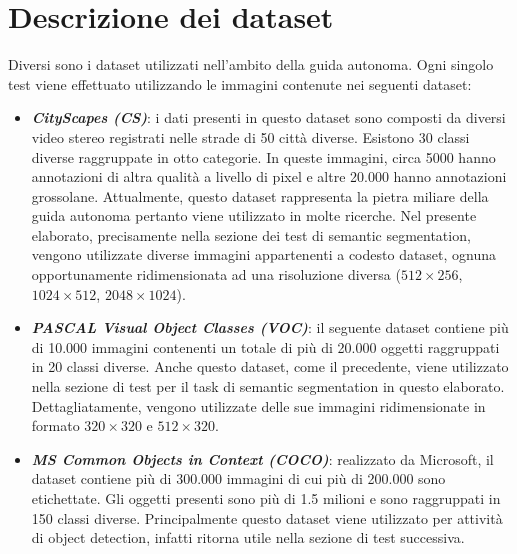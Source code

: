 \section{Descrizione dei dataset}
Diversi sono i dataset utilizzati nell'ambito della guida autonoma.
Ogni singolo test viene effettuato utilizzando le immagini contenute nei seguenti dataset: 
\begin{itemize}
    \item {\bfseries{\emph{CityScapes (CS)}}}\cite{Cityscapes}: i dati presenti in questo dataset sono composti da 
    diversi video stereo registrati nelle strade di 50 città diverse. Esistono 
    30 classi diverse raggruppate in otto categorie. In queste immagini, 
    circa 5000 hanno annotazioni di altra qualità a livello di pixel e altre 
    20.000 hanno annotazioni grossolane. Attualmente, questo dataset 
    rappresenta la pietra miliare della guida autonoma pertanto viene 
    utilizzato in molte ricerche. Nel presente elaborato, precisamente 
    nella sezione dei test di semantic segmentation, vengono utilizzate diverse 
    immagini appartenenti a codesto dataset, ognuna opportunamente ridimensionata ad una risoluzione diversa 
    ($512\times 256$, $1024\times 512$, $2048\times 1024$).
    \item {\bfseries{\emph{PASCAL Visual Object Classes (VOC)}}}\cite{VOC}: il seguente dataset 
    contiene più di 10.000 immagini contenenti un totale di più di 20.000 
    oggetti raggruppati in 20 classi diverse. Anche questo dataset, come 
    il precedente, viene utilizzato nella sezione di test per il task di 
    semantic segmentation in questo elaborato. Dettagliatamente, vengono 
    utilizzate delle sue immagini ridimensionate in formato $320\times 320$ e $512\times 320$.
    \item {\bfseries{\emph{MS Common Objects in Context (COCO)}}}\cite{COCO}: realizzato da 
    Microsoft, il dataset contiene più di 300.000 immagini di cui più di 
    200.000 sono etichettate. Gli oggetti presenti sono più di 1.5 milioni e 
    sono raggruppati in 150 classi diverse. Principalmente questo dataset 
    viene utilizzato per attività di object detection, infatti ritorna utile 
    nella sezione di test successiva.
\end{itemize}

